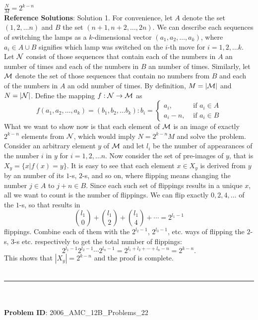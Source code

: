 \(\frac{N}{M} = 2^{k - n}\) \\
    \textbf{Reference Solutions}: Solution 1. For convenience, let $A$ denote the set $(1,2,\ldots n)$ and $B$ the set $(n+1,n+2,\ldots,2n)$.
We can describe each sequences of switching the lamps as a $k$-dimensional vector
$(a_1, a_2, \ldots, a_k)$, where $a_i \in A \cup B$ signifies which lamp was switched on the $i$-th move for $i=1,2,\ldots k$. 
Let $\cal{N}$ consist of those sequences that contain each of the numbers in $A$ an  number of times and each of the numbers in $B$ an  number of times. Similarly, let $\cal{M}$ denote the set of those sequences that contain no numbers from $B$ and each of the numbers in $A$ an odd number of times. By definition, $M=|\cal{M}|$ and $N=|\cal{N}|$.
Define the mapping $f:\cal{N} \rightarrow \cal{M}$ as
\[f(a_1, a_2, \ldots, a_k) = (b_1,b_2,\ldots b_k) :  b_i =  \begin{cases}    a_i, & \mbox{ if }  a_i \in A \\    a_i-n, & \mbox{ if } a_i  \in B \end{cases}\]
What we want to show now is that each element of $\cal{M}$ is an image of exactly $2^{k-n}$ elements from $\cal{N}$, which would imply $N = 2^{k-n}M$ and solve the problem.
Consider an arbitrary element $y$ of $\cal{M}$ and let $l_i$ be the number of appearances of the number $i$ in $y$ for $i=1,2,\ldots n$. Now consider the set of pre-images of $y$, that is $X_y = \{ x | f(x) = y \}$.
It is easy to see that each element $x\in X_y$ is derived from $y$ by  an  number of its $1$-s, $2$-s, and so on, where flipping means changing the number $j\in A$ to $j+n\in B$. Since each such set of flippings results in a unique $x$, all we want to count is the number of flippings. We can flip exactly $0, 2, 4,\ldots$ of the $1$-s, so that results in
\[\binom{l_1}{0} + \binom{l_1}{2}+\binom{l_1}{4}+\cdots = 2^{l_1-1}\]
flippings. Combine each of them with the $2^{l_2-1}$, $2^{l_3-1}$, etc. ways of flipping the $2$-s, $3$-s etc. respectively to get the total number of flippings:
\[2^{l_1-1}2^{l_2-1}\cdots2^{l_n-1} = 2^{l_1+l_2+\cdots+l_n-n} = 2^{k-n}.\] 
This shows that $|X_y| = 2^{k-n}$ and the proof is complete. \\
    \vspace{0.3cm} \\
    \hrule \\
    \vspace{0.5cm} \\
    \textbf{Problem ID}: 2006_AMC_12B_Problems_22 \\
